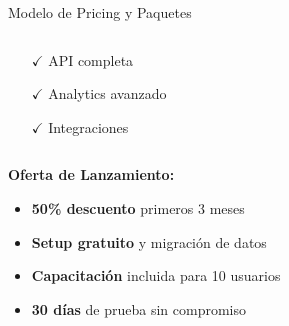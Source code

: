 \documentclass[aspectratio=169,11pt]{beamer}
\begin{document}
\begin{frame}{Modelo de Pricing y Paquetes}
\begin{columns}
\begin{column}{0.33\textwidth}
\begin{center}
{\begin{minipage}{0.9\textwidth}
\begin{itemize}
                        \item[$\checkmark$] API completa
                        \item[$\checkmark$] Analytics avanzado
                        \item[$\checkmark$] Integraciones
                    \end{itemize}
                \end{minipage}}
            \end{center}
        \end{column}
        \begin{column}{0.33\textwidth}
            \begin{center}
            \end{center}
        \end{column}
    \end{columns}
    
    \vspace{0.8cm}
    \textbf{\textcolor{jazzorange}{Oferta de Lanzamiento:}}
    \begin{itemize}
        \item \textbf{50\% descuento} primeros 3 meses
        \item \textbf{Setup gratuito} y migración de datos
        \item \textbf{Capacitación} incluida para 10 usuarios
        \item \textbf{30 días} de prueba sin compromiso
    \end{itemize}
\end{frame}
\end{document}
